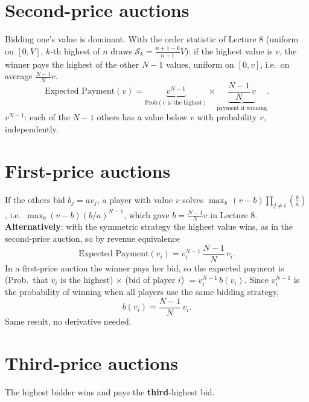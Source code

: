 \documentclass[11pt,a4paper,openany]{book}
\begin{document}
\section{Second-price auctions}

\begin{propbox}[title={Expected payment, values uniform on $[0,1]$}]
Bidding one's value is dominant. With the order statistic of Lecture 8 (uniform on $[0,V]$,
$k$-th highest of $n$ draws $\mathcal{S}_k = \frac{n+1-k}{n+1}V$): if the highest value is
$v$, the winner pays the highest of the other $N-1$ values, uniform on $[0,v]$, i.e.\ on
average $\frac{N-1}{N} v$.
\[
\text{Expected Payment}(v)
= \underbrace{v^{N-1}}_{\text{Prob}(v \text{ is the highest})}
  \times \underbrace{\frac{N-1}{N}\, v}_{\text{payment if winning}}.
\]
$v^{N-1}$: each of the $N-1$ others has a value below $v$ with probability $v$,
independently.
\end{propbox}


\section{First-price auctions}

\begin{propbox}[title=Optimal bid via revenue equivalence]
If the others bid $b_j = a v_j$, a player with value $v$ solves
$\max_b\, (v - b)\prod_{j \neq i} \left(\frac{b}{a}\right)$, i.e.\ $\max_b (v-b)(b/a)^{N-1}$,
which gave $b = \frac{N-1}{N} v$ in Lecture 8. \\
\textbf{Alternatively}: with the symmetric strategy the highest value wins, as in the
second-price auction, so by revenue equivalence
\[
\text{Expected Payment}(v_i) = v_i^{N-1}\,\frac{N-1}{N}\, v_i.
\]
In a first-price auction the winner pays her bid, so the expected payment is
(Prob.\ that $v_i$ is the highest) $\times$ (bid of player $i$) $= v_i^{N-1}\, b(v_i)$. Since
$v_i^{N-1}$ is the probability of winning when all players use the same bidding strategy,
\[
b(v_i) = \frac{N-1}{N}\, v_i.
\]
Same result, no derivative needed.
\end{propbox}


\section{Third-price auctions}

\begin{defnbox}[title=Third-price auction]
The highest bidder wins and pays the \textbf{third}-highest bid.
\end{defnbox}
\end{document}
